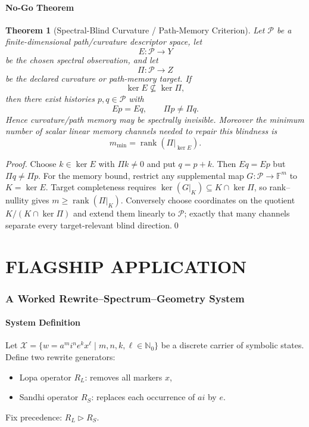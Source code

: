 \documentclass[12pt, oneside]{article}
\newtheorem{theorem}{Theorem}[section]
\begin{document}
\subsection{No-Go Theorem}

\begin{theorem}[Spectral-Blind Curvature / Path-Memory Criterion]
Let $\mathcal P$ be a finite-dimensional path/curvature descriptor space, let
\[
E:\mathcal P\to Y
\]
be the chosen spectral observation, and let
\[
\Pi:\mathcal P\to Z
\]
be the declared curvature or path-memory target. If
\[
\ker E\not\subseteq\ker\Pi,
\]
then there exist histories $p,q\in\mathcal P$ with
\[
Ep=Eq,
\qquad
\Pi p\ne\Pi q.
\]
Hence curvature/path memory may be spectrally invisible. Moreover the minimum number of scalar linear memory channels needed to repair this blindness is
\[
m_{\min}=\operatorname{rank}(\Pi|_{\ker E}).
\]
\end{theorem}

\begin{proof}
Choose $k\in\ker E$ with $\Pi k\ne0$ and put $q=p+k$. Then $Eq=Ep$ but $\Pi q\ne\Pi p$. For the memory bound, restrict any supplemental map $G:\mathcal P\to\mathbb F^m$ to $K=\ker E$. Target completeness requires $\ker(G|_K)\subseteq K\cap\ker\Pi$, so rank--nullity gives $m\ge \operatorname{rank}(\Pi|_K)$. Conversely choose coordinates on the quotient $K/(K\cap\ker\Pi)$ and extend them linearly to $\mathcal P$; exactly that many channels separate every target-relevant blind direction.\qed
\end{proof}

\part{FLAGSHIP APPLICATION}

\section{A Worked Rewrite–Spectrum–Geometry System}

\subsection{System Definition}

Let $\mathcal{X} = \{ w = a^m i^n e^k x^\ell \mid m,n,k,\ell \in \mathbb{N}_0 \}$ be a discrete carrier of symbolic states. Define two rewrite generators:
\begin{itemize}
    \item Lopa operator $R_L$: removes all markers $x$,
    \item Sandhi operator $R_S$: replaces each occurrence of $ai$ by $e$.
\end{itemize}
Fix precedence: $R_L \triangleright R_S$.
\end{document}
